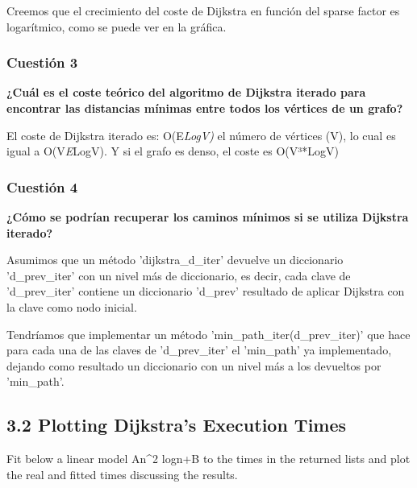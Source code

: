 \documentclass[11pt]{article}
\begin{document}
Creemos que el crecimiento del coste de Dijkstra en función del sparse
factor es logarítmico, como se puede ver en la gráfica.

    \subsubsection{Cuestión 3}\label{cuestiuxf3n-3}

\textbf{¿Cuál es el coste teórico del algoritmo de Dijkstra iterado para
encontrar las distancias mínimas entre todos los vértices de un grafo?}

El coste de Dijkstra iterado es:
O(\textbar{}E\textbar{}\emph{Log\textbar{}V\textbar{}) } el número de
vértices (V), lo cual es igual a
O(\textbar{}V\textbar{}\emph{\textbar{}E\textbar{}}Log\textbar{}V\textbar{}).
Y si el grafo es denso, el coste es
O(\textbar{}V\textbar{}³*Log\textbar{}V\textbar{})

\subsubsection{Cuestión 4}\label{cuestiuxf3n-4}

\textbf{¿Cómo se podrían recuperar los caminos mínimos si se utiliza
Dijkstra iterado?}

Asumimos que un método 'dijkstra\_d\_iter' devuelve un diccionario
'd\_prev\_iter' con un nivel más de diccionario, es decir, cada clave de
'd\_prev\_iter' contiene un diccionario 'd\_prev' resultado de aplicar
Dijkstra con la clave como nodo inicial.

Tendríamos que implementar un método 'min\_path\_iter(d\_prev\_iter)'
que hace para cada una de las claves de 'd\_prev\_iter' el 'min\_path'
ya implementado, dejando como resultado un diccionario con un nivel más
a los devueltos por 'min\_path'.

    \subsection{3.2 Plotting Dijkstra's Execution
Times}\label{plotting-dijkstras-execution-times}

Fit below a linear model An\^{}2 logn+B to the times in the returned
lists and plot the real and fitted times discussing the results.
\end{document}
